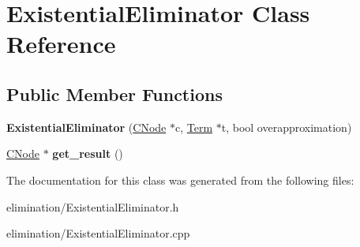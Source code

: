 \hypertarget{classExistentialEliminator}{\section{\-Existential\-Eliminator \-Class \-Reference}
\label{classExistentialEliminator}
}
\subsection*{\-Public \-Member \-Functions}
\begin{DoxyCompactItemize}
\item 
\hypertarget{classExistentialEliminator_a67bb7978f5b99a559a5f61cf60be1fbd}{{\bfseries \-Existential\-Eliminator} (\hyperlink{classCNode}{\-C\-Node} $\ast$c, \hyperlink{classTerm}{\-Term} $\ast$t, bool overapproximation)}\label{classExistentialEliminator_a67bb7978f5b99a559a5f61cf60be1fbd}

\item 
\hypertarget{classExistentialEliminator_ae14a3917156d8feb30319a3da0f7be46}{\hyperlink{classCNode}{\-C\-Node} $\ast$ {\bfseries get\-\_\-result} ()}\label{classExistentialEliminator_ae14a3917156d8feb30319a3da0f7be46}

\end{DoxyCompactItemize}


\-The documentation for this class was generated from the following files\-:\begin{DoxyCompactItemize}
\item 
elimination/\-Existential\-Eliminator.\-h\item 
elimination/\-Existential\-Eliminator.\-cpp\end{DoxyCompactItemize}
